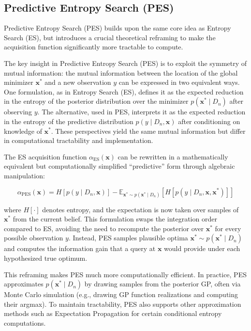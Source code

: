 \documentclass{ut-thesis}
\begin{document}
\subsection{Predictive Entropy Search (PES)}

Predictive Entropy Search (PES) builds upon the same core idea as Entropy Search (ES), but introduces a crucial theoretical reframing to make the acquisition function significantly more tractable to compute\cite{hernandez2014predictive}. 

The key insight in Predictive Entropy Search (PES) is to exploit the symmetry of mutual information: the mutual information between the location of the global minimizer \( \mathbf{x}^* \) and a new observation \( y \) can be expressed in two equivalent ways. One formulation, as in Entropy Search (ES), defines it as the expected reduction in the entropy of the posterior distribution over the minimizer \( p(\mathbf{x}^* \mid D_n) \) after observing \( y \). The alternative, used in PES, interprets it as the expected reduction in the entropy of the predictive distribution \( p(y \mid D_n, \mathbf{x}) \) after conditioning on knowledge of \( \mathbf{x}^* \). These perspectives yield the same mutual information but differ in computational tractability and implementation.

The ES acquisition function \( \alpha_{\text{ES}}(\mathbf{x}) \) can be rewritten in a mathematically equivalent but computationally simplified “predictive” form through algebraic manipulation:

\begin{equation}
    \alpha_{\text{PES}}(\mathbf{x}) = H[p(y \mid D_n, \mathbf{x})] - \mathbb{E}_{\mathbf{x}^* \sim p(\mathbf{x}^* \mid D_n)} \left[ H[p(y \mid D_n, \mathbf{x}, \mathbf{x}^*)] \right]
\end{equation}

where \( H[\cdot] \) denotes entropy, and the expectation is now taken over samples of \( \mathbf{x}^* \) from the current belief. This formulation swaps the integration order compared to ES, avoiding the need to recompute the posterior over \( \mathbf{x}^* \) for every possible observation \( y \). Instead, PES samples plausible optima \( \mathbf{x}^* \sim p(\mathbf{x}^* \mid D_n) \) and computes the information gain that a query at \( \mathbf{x} \) would provide under each hypothesized true optimum.

This reframing makes PES much more computationally efficient. In practice, PES approximates \( p(\mathbf{x}^* \mid D_n) \) by drawing samples from the posterior GP, often via Monte Carlo simulation (e.g., drawing GP function realizations and computing their argmax). To maintain tractability, PES also supports other approximation methods such as Expectation Propagation for certain conditional entropy computations.
\end{document}
